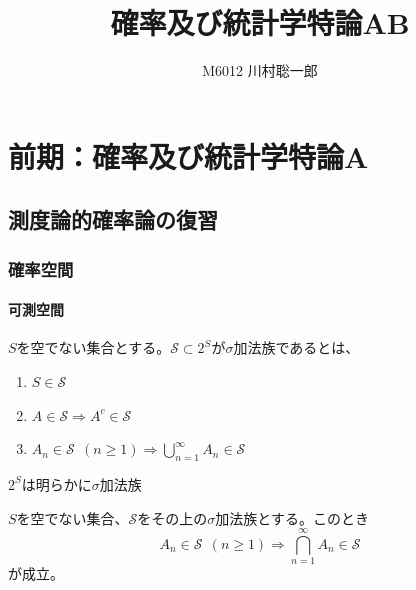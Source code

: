 \documentclass[dvipdfmx, leqno]{jsbook}
\title{確率及び統計学特論AB}
\author{M6012 川村聡一郎}
\date{}
\begin{document}
\maketitle
\tableofcontents

\part{前期：確率及び統計学特論A}
%
%
%
%
%
%
%
%
%
%
%
%
%





\chapter{測度論的確率論の復習}
\section{確率空間}
\subsection{可測空間}
    $S$を空でない集合とする。$\mathcal{S}\subset 2^S$が$\sigma$加法族であるとは、
\begin{enumerate}
    \item $S\in \mathcal{S}$
    \item $A\in \mathcal{S}\Rightarrow A^c\in \mathcal{S}$
    \item $A_n\in \mathcal{S}\ \ (n\ge 1) \Rightarrow \bigcup_{n= 1}^\infty A_n\in \mathcal{S}$
\end{enumerate}

    $2^S$は明らかに$\sigma$加法族

    $S$を空でない集合、$\mathcal{S}$をその上の$\sigma$加法族とする。このとき
\begin{equation}
    A_n\in \mathcal{S}\ \ (n\ge 1)\Rightarrow \bigcap_{n= 1}^\infty A_n\in \mathcal{S}
\end{equation}
    が成立。
    


\end{document}
